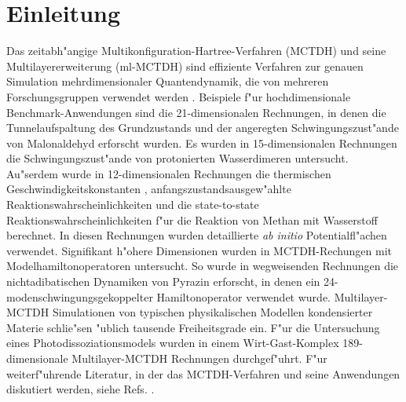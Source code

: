 \chapter{Einleitung}
\label{ch:einleitung}

Das zeitabh"angige Multikonfiguration-Hartree-Verfahren (MCTDH) 
\cite{MMC, MMC1} und seine Multilayererweiterung (ml-MCTDH)
\cite{WT3, Mreview2} 
sind effiziente Verfahren zur genauen Simulation mehrdimensionaler Quantendynamik,
die von mehreren Forschungsgruppen verwendet werden 
\cite{MCTDHex1, WestPNM, MCTDHex2, W1, MCTDHex4, MCTDHex5, MCTDHex6, MCTDHex7, MCTDHex8,
MCTDHex9, MCTDHex10, MCTDHex11, MCTDHex12, MCTDHex13, MCTDHex14, MCTDHex15, MCTDHex16, MCTDHex17,MCTDHex18}. 
Beispiele f"ur hochdimensionale 
Benchmark-Anwendungen sind die 21-dimen\-sio\-nalen Rechnungen, in denen die Tunnelaufspaltung des
Grundzustands \cite{CVM, HCVM, HaM1, MAMCTDH, HaM2, MAMCTDH2} und der angeregten \cite{HCVM, HaM1, MAMCTDH, HaM2, MAMCTDH2}
Schwingungszust"ande von Malonaldehyd erforscht wurden. 
Es wurden in 15-dimen\-sio\-nalen Rechnungen die Schwingungszust"ande von protonierten 
Wasserdi\-meren  \cite{H5O2+MCTDH, H5O2+MCTDH2, H5O2+MCTDH3, H5O2+MCTDH4, H5O2+MCTDH5} untersucht. 
Au"serdem wurde in 12-dimensionalen Rechnungen die thermischen 
Geschwindig\-keitskonstanten \cite{HM1, HM2, WWM, SM, vHNM,NvHM}, anfangszustandsausgew"ahlte Reaktionswahr\-scheinlichkeiten
\cite{SM02, SM04, WeM5, WeM6, WeM8} und die 
state-to-state Reaktionswahrscheinlichkeiten \cite{WeM7} f"ur die Reaktion von Methan mit Wasserstoff 
berechnet. In diesen Rechnungen wurden detaillierte \textit{ab initio} 
Potentialfl"achen verwendet. Signifikant h"ohere Dimensionen wurden in MCTDH-Rechungen mit 
Modelhamiltonoperatoren untersucht. So wurde in wegweisenden Rechnungen  
die nichtadibatischen Dynamiken von Pyrazin erforscht, in denen ein 24-modenschwingungsgekoppelter 
Hamiltonoperator \cite{WMC, WMC2, RWMC} verwendet wurde.
Multilayer-MCTDH Simulationen von typischen
physikalischen Modellen \cite{WT3, W1, WST, KCBWT, CTW2, WPHT} kondensierter Materie schlie"sen "ublich tausende Freiheitsgrade ein.
F"ur die Untersuchung eines Photodissoziationsmodels wurden in einem Wirt-Gast-Komplex 189-dimensionale 
Multilayer-MCTDH Rechnungen  durchgef"uhrt\cite{WBRSM}. 
F"ur weiterf"uhrende Literatur, in der das MCTDH-Verfahren und seine Anwendungen diskutiert werden, siehe Refs. \cite{MCTDHreview, MCTDHreview2, HMreview1, MCTDHbook,Mreview2011, MCTDHreview3}.

